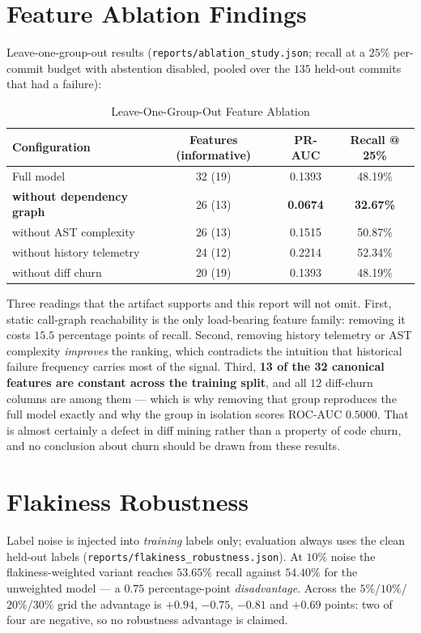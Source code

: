 \section{Feature Ablation Findings}
Leave-one-group-out results (\texttt{reports/ablation\_study.json}; recall at a $25\%$ per-commit budget
with abstention disabled, pooled over the $135$ held-out commits that had a failure):

\begin{table}[htbp]
\centering
\caption{Leave-One-Group-Out Feature Ablation}
\label{tab:ktu_ablation}
\small
\begin{tabular}{lccc}
\toprule
\textbf{Configuration} & \textbf{Features (informative)} & \textbf{PR-AUC} & \textbf{Recall @ 25\%} \\
\midrule
Full model & 32 (19) & 0.1393 & 48.19\% \\
\textbf{without dependency graph} & 26 (13) & \textbf{0.0674} & \textbf{32.67\%} \\
without AST complexity & 26 (13) & 0.1515 & 50.87\% \\
without history telemetry & 24 (12) & 0.2214 & 52.34\% \\
without diff churn & 20 (19) & 0.1393 & 48.19\% \\
\bottomrule
\end{tabular}
\end{table}

Three readings that the artifact supports and this report will not omit. First, static call-graph
reachability is the only load-bearing feature family: removing it costs $15.5$ percentage points of
recall. Second, removing history telemetry or AST complexity \emph{improves} the ranking, which
contradicts the intuition that historical failure frequency carries most of the signal. Third,
\textbf{13 of the 32 canonical features are constant across the training split}, and all $12$ diff-churn
columns are among them --- which is why removing that group reproduces the full model exactly and why the
group in isolation scores ROC-AUC $0.5000$. That is almost certainly a defect in diff mining rather than
a property of code churn, and no conclusion about churn should be drawn from these results.

\section{Flakiness Robustness}
Label noise is injected into \emph{training} labels only; evaluation always uses the clean held-out
labels (\texttt{reports/flakiness\_robustness.json}). At $10\%$ noise the flakiness-weighted variant
reaches $53.65\%$ recall against $54.40\%$ for the unweighted model --- a $0.75$ percentage-point
\emph{disadvantage}. Across the $5\%$/$10\%$/$20\%$/$30\%$ grid the advantage is $+0.94$, $-0.75$,
$-0.81$ and $+0.69$ points: two of four are negative, so no robustness advantage is claimed.

